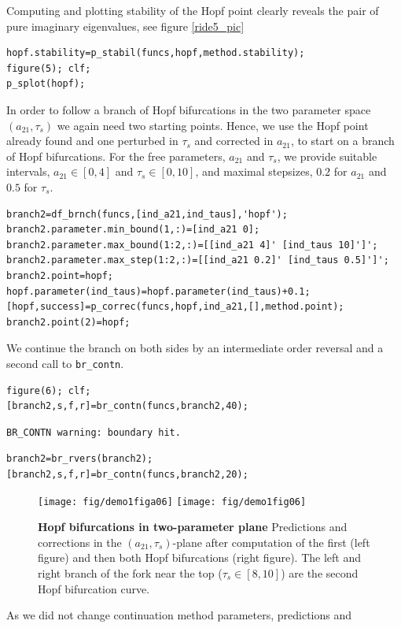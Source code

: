 \documentclass[10pt]{scrartcl}
\newcommand{\blist}[1]{\mbox{\lstinline!#1!}}
\begin{document}
Computing and plotting stability of the Hopf point clearly reveals the pair of pure
imaginary eigenvalues, see figure \ref{ride5_pic} 
\begin{lstlisting}
hopf.stability=p_stabil(funcs,hopf,method.stability);
figure(5); clf;
p_splot(hopf); 
\end{lstlisting} In order to follow a branch of Hopf bifurcations in
the two parameter space $(a_{21},\tau_s)$ we again need two starting
points.  Hence, we use the Hopf point already found and one perturbed
in $\tau_s$ and corrected in $a_{21}$, to start on a branch of Hopf
bifurcations.  For the free parameters, $a_{21}$ and $\tau_s$, we
provide suitable intervals, $a_{21}\in[0,4]$ and $\tau_s\in[0,10]$,
and maximal stepsizes, $0.2$ for $a_{21}$ and $0.5$ for $\tau_s$.
\begin{lstlisting}
branch2=df_brnch(funcs,[ind_a21,ind_taus],'hopf');
branch2.parameter.min_bound(1,:)=[ind_a21 0];
branch2.parameter.max_bound(1:2,:)=[[ind_a21 4]' [ind_taus 10]']';
branch2.parameter.max_step(1:2,:)=[[ind_a21 0.2]' [ind_taus 0.5]']';
branch2.point=hopf;
hopf.parameter(ind_taus)=hopf.parameter(ind_taus)+0.1;          
[hopf,success]=p_correc(funcs,hopf,ind_a21,[],method.point);
branch2.point(2)=hopf; 
\end{lstlisting}
We continue the branch on both sides by an intermediate order
reversal and a second call to \blist{br_contn}.
\begin{lstlisting}
figure(6); clf;
[branch2,s,f,r]=br_contn(funcs,branch2,40);
\end{lstlisting}
{\small
\begin{verbatim}
BR_CONTN warning: boundary hit.
\end{verbatim}
}
\begin{lstlisting}
branch2=br_rvers(branch2);
[branch2,s,f,r]=br_contn(funcs,branch2,20);
\end{lstlisting}
\begin{figure}[h]
\begin{center}
  \texttt{[image: fig/demo1figa06]}
  \texttt{[image: fig/demo1fig06]}
\end{center}
\caption{\label{ride6_pic} \textbf{\textsf{Hopf bifurcations in
      two-parameter plane}} Predictions and corrections in the
  $(a_{21},\tau_s)$-plane after computation of the first (left figure)
  and then both Hopf bifurcations (right figure).  The left and right
  branch of the fork near the top ($\tau_s\in[8,10]$) are the second
  Hopf bifurcation curve.}
\end{figure}
As we did not change continuation method parameters, predictions and
\end{document}
